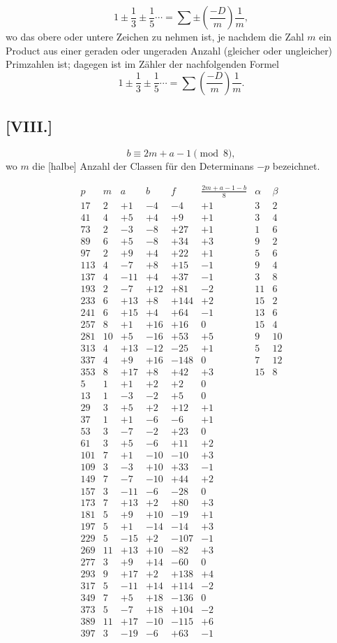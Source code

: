 \documentclass[12pt]{article}
\begin{document}
\[
1\pm\frac13\pm\frac15\cdots=\sum\pm\left(\frac{-D}{m}\right)\frac1m,
\]
wo das obere oder untere Zeichen zu nehmen ist, je nachdem die Zahl $m$ ein Product aus einer geraden oder ungeraden Anzahl (gleicher oder ungleicher) Primzahlen ist; dagegen ist im Zähler der nachfolgenden Formel
\[
1\pm\frac13\pm\frac15\cdots=\sum\left(\frac{-D}{m}\right)\frac1m .
\]

\subsection*{[VIII.]}

\[
b\equiv 2m+a-1\pmod{8},
\]
wo $m$ die [halbe] Anzahl der Classen für den Determinans $-p$ bezeichnet.

{\scriptsize
\[
\begin{array}{r|r|r|r|r|r|r|r}
p&m&a&b&f&\frac{2m+a-1-b}{8}&\alpha&\beta\\ \hline
17&2&+1&-4&-4&+1&3&2\\
41&4&+5&+4&+9&+1&3&4\\
73&2&-3&-8&+27&+1&1&6\\
89&6&+5&-8&+34&+3&9&2\\
97&2&+9&+4&+22&+1&5&6\\
113&4&-7&+8&+15&-1&9&4\\
137&4&-11&+4&+37&-1&3&8\\
193&2&-7&+12&+81&-2&11&6\\
233&6&+13&+8&+144&+2&15&2\\
241&6&+15&+4&+64&-1&13&6\\
257&8&+1&+16&+16&0&15&4\\
281&10&+5&-16&+53&+5&9&10\\
313&4&+13&-12&-25&+1&5&12\\
337&4&+9&+16&-148&0&7&12\\
353&8&+17&+8&+42&+3&15&8\\
5&1&+1&+2&+2&0&&\\
13&1&-3&-2&+5&0&&\\
29&3&+5&+2&+12&+1&&\\
37&1&+1&-6&-6&+1&&\\
53&3&-7&-2&+23&0&&\\
61&3&+5&-6&+11&+2&&\\
101&7&+1&-10&-10&+3&&\\
109&3&-3&+10&+33&-1&&\\
149&7&-7&-10&+44&+2&&\\
157&3&-11&-6&-28&0&&\\
173&7&+13&+2&+80&+3&&\\
181&5&+9&+10&-19&+1&&\\
197&5&+1&-14&-14&+3&&\\
229&5&-15&+2&-107&-1&&\\
269&11&+13&+10&-82&+3&&\\
277&3&+9&+14&-60&0&&\\
293&9&+17&+2&+138&+4&&\\
317&5&-11&+14&+114&-2&&\\
349&7&+5&+18&-136&0&&\\
373&5&-7&+18&+104&-2&&\\
389&11&+17&-10&-115&+6&&\\
397&3&-19&-6&+63&-1&&
\end{array}
\]
}
\end{document}

